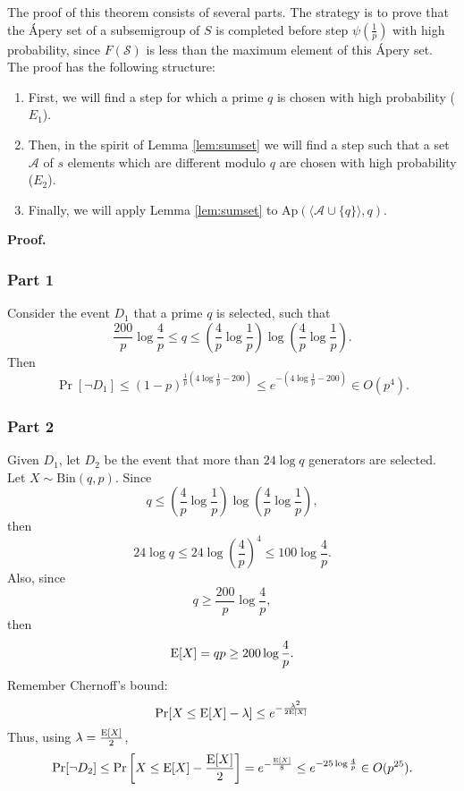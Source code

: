 \par The proof of this theorem consists of several parts. The strategy is to prove that the Ápery set of a subsemigroup of $S$ is completed before step $\psi\left(\frac{1}{p}\right)$ with high probability, since $F(\mathcal{S})$ is less than the maximum element of this Ápery set. The proof has the following structure: 
\begin{enumerate}
\item First, we will find a step for which a prime $q$ is chosen with high probability ($E_1$). 
\item Then, in the spirit of Lemma \ref{lem:sumset} we will find a step such that a set $\mathcal{A}$ of $s$ elements which are different modulo $q$ are chosen with high probability ($E_2$). 
\item Finally, we will apply Lemma \ref{lem:sumset} to $\mathrm{Ap}(\langle \mathcal{A} \cup \{q\}\rangle, q)$.
\end{enumerate}
\textbf{Proof. }
\subsubsection*{Part 1} 
Consider the event $D_1$ that a prime $q$ is selected, such that
\[\frac{200}{p}\log \frac{4}{p} \leq q \leq \left(\frac{4}{p}\log \frac{1}{p}\right)\log\left(\frac{4}{p}\log \frac{1}{p}\right).\]
Then
\[\Pr[\lnot D_1] \leq (1 - p)^{\frac{1}{p}\left(4\log\frac{1}{p} - 200\right)} \leq e^{-\left(4\log\frac{1}{p} - 200\right)} \in  O(p^4).\]
\subsubsection*{Part 2}

Given $D_1$, let $D_2$ be the event that more than $24\log q$ generators are selected. 
    Let $X \sim \mathrm{Bin}(q, p)$. Since 
    \[q \leq \left(\frac{4}{p}\log \frac{1}{p}\right)\log\left(\frac{4}{p}\log \frac{1}{p}\right),\]
    then
    \[24\log q \leq 24\log \left(\frac{4}{p}\right)^4 \leq 100\log\frac{4}{p}.\]
    Also, since 
    \[q \geq \frac{200}{p}\log\frac{4}{p},\]
    then 
    \[\mathrm{E}[X]  = qp \geq 200\log\frac{4}{p}.\]
    Remember Chernoff's bound: 
    \begin{equation}
        \mathrm{Pr}[X \leq \mathrm{E}[X] - \lambda] \leq e^{-\frac{\lambda^2}{2\mathrm{E}[X]}} 
    \end{equation}
    Thus, using $\lambda = \frac{\mathrm{E}[X]}{2}$,
    \begin{equation}
        \mathrm{Pr}[\lnot D_2] \leq \mathrm{Pr}\left[X \leq \mathrm{E}[X] - \frac{\mathrm{E}[X]}{2}\right] = e^{-\frac{\mathrm{E}[X]}{8}} \leq e^{-25\log \frac{4}{p}} \in O(p^{25}).
    \end{equation}


